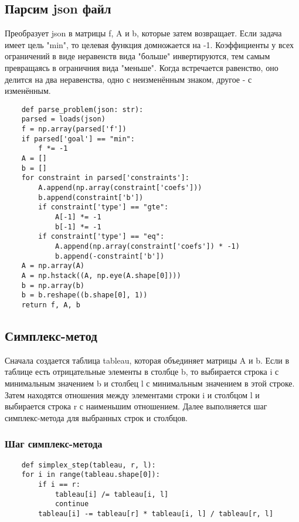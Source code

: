 \documentclass{article}
\begin{document}
\subsection{Парсим json файл}

Преобразует json в матрицы f, A и b, которые затем возвращает. Если задача имеет цель "min", то целевая функция домножается на -1.
Коэффициенты у всех ограничений в виде неравенств вида "больше" инвертируются, тем самым превращаясь в ограничния вида "меньше".
Когда встречается равенство, оно делится на два неравенства, одно с неизменённым знаком, другое - с изменённым.

\begin{listing}[H]
    \begin{verbatim}
    def parse_problem(json: str):
    parsed = loads(json)
    f = np.array(parsed['f'])
    if parsed['goal'] == "min":
        f *= -1
    A = []
    b = []
    for constraint in parsed['constraints']:
        A.append(np.array(constraint['coefs']))
        b.append(constraint['b'])
        if constraint['type'] == "gte":
            A[-1] *= -1
            b[-1] *= -1
        if constraint['type'] == "eq":
            A.append(np.array(constraint['coefs']) * -1)
            b.append(-constraint['b'])
    A = np.array(A)
    A = np.hstack((A, np.eye(A.shape[0])))
    b = np.array(b)
    b = b.reshape((b.shape[0], 1))
    return f, A, b
    \end{verbatim}
\end{listing}

\subsection{Симплекс-метод}

Сначала создается таблица tableau, которая объединяет матрицы A и b. Если в таблице есть отрицательные элементы в столбце b, то выбирается строка i с минимальным значением b и столбец l с минимальным значением в этой строке. Затем находятся отношения между элементами строки i и столбцом l и выбирается строка r с наименьшим отношением. Далее выполняется шаг симплекс-метода для выбранных строк и столбцов.

\subsubsection{Шаг симплекс-метода}
\begin{listing}[H]
    \begin{verbatim}
    def simplex_step(tableau, r, l):
    for i in range(tableau.shape[0]):
        if i == r:
            tableau[i] /= tableau[i, l]
            continue
        tableau[i] -= tableau[r] * tableau[i, l] / tableau[r, l]
    \end{verbatim}
\end{listing}
\end{document}
